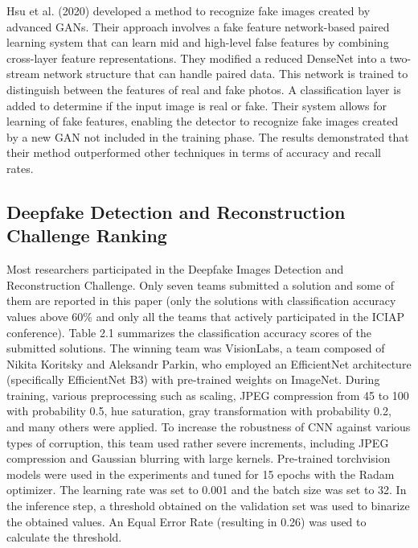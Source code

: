 Hsu et al. (2020) \cite{hung2021multi} developed a method to recognize fake images created by advanced GANs. Their approach involves a fake feature network-based paired learning system that can learn mid and high-level false features by combining cross-layer feature representations. They modified a reduced DenseNet into a two-stream network structure that can handle paired data. This network is trained to distinguish between the features of real and fake photos. A classification layer is added to determine if the input image is real or fake. Their system allows for learning of fake features, enabling the detector to recognize fake images created by a new GAN not included in the training phase. The results demonstrated that their method outperformed other techniques in terms of accuracy and recall rates.

\newpage
\subsection{Deepfake Detection and Reconstruction Challenge Ranking}
Most researchers participated in the Deepfake Images Detection and Reconstruction
Challenge. Only seven teams submitted a solution and some of them are reported
in this paper (only the solutions with classification accuracy values above 60\% and only
all the teams that actively participated in the ICIAP conference). Table 2.1 summarizes the
classification accuracy scores of the submitted solutions. The winning team
was VisionLabs, a team composed of Nikita Koritsky and Aleksandr Parkin, who employed
an EfficientNet architecture \cite{pmlr-v97-tan19a} (specifically EfficientNet B3) with pre-trained weights on
ImageNet. During training, various preprocessing such as scaling, JPEG compression from
45 to 100 with probability 0.5, hue saturation, gray transformation with probability 0.2,
and many others were applied. To increase the robustness of CNN against various types
of corruption, this team used rather severe increments, including JPEG compression and
Gaussian blurring with large kernels. Pre-trained torchvision models were used in the
experiments and tuned for 15 epochs with the Radam optimizer\cite{liu2021variance}. The learning rate was
set to 0.001 and the batch size was set to 32. In the inference step, a threshold obtained on
the validation set was used to binarize the obtained values. An Equal Error Rate (resulting
in 0.26) was used to calculate the threshold. \cite{jimaging8100263}
\vspace{1cm}

